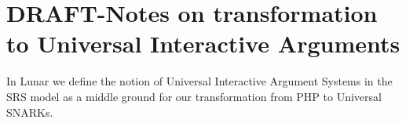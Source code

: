 \documentclass[runningheads,11pt]{llncs}
\begin{document}
  






























\section{DRAFT-Notes on transformation to Universal Interactive Arguments}

In Lunar we define the notion of Universal Interactive Argument Systems in the SRS model
as a middle ground for our transformation from PHP to Universal SNARKs.
\end{document}
